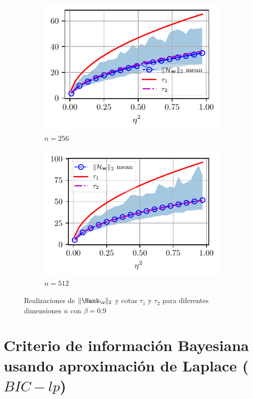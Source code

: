 \begin{figure}[t]
\begin{subfigure}{0.4\linewidth}
			\includegraphics[width = \linewidth]{Figuras/taus_N_256_beta_0.9.pdf}
			\caption{$n = 256$}
		\end{subfigure}
		\begin{subfigure}{0.4\linewidth}
			\centering
			\includegraphics[width = \linewidth]{Figuras/taus_N_512_beta_0.9.pdf}
			\caption{$n = 512$}
		\end{subfigure}
		\caption{Realizaciones de $\|\Hank_\w\|_2$ y cotas $\tau_1$ y $\tau_2$ para diferentes dimensiones $n$ con $\beta = 0.9$}
		\label{fig:taus11}
	\end{figure}



	 
	
	\section{Criterio de información Bayesiana usando aproximación de Laplace ($BIC-lp$)}\label{BIC_Appendix}
	
